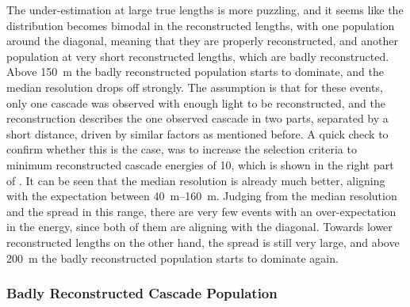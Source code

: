 The under-estimation at large true lengths is more puzzling, and it seems like the distribution becomes bimodal in the reconstructed lengths, with one population around the diagonal, meaning that they are properly reconstructed, and another population at very short reconstructed lengths, which are badly reconstructed. Above \SI{150}{\meter} the badly reconstructed population starts to dominate, and the median resolution drops off strongly. The assumption is that for these events, only one cascade was observed with enough light to be reconstructed, and the reconstruction describes the one observed cascade in two parts, separated by a short distance, driven by similar factors as mentioned before. A quick check to confirm whether this is the case, was to increase the selection criteria to minimum reconstructed cascade energies of \SI{10}{\gev}, which is shown in the right part of . It can be seen that the median resolution is already much better, aligning with the expectation between \SIrange[range-phrase=~and~]{40}{160}{\meter}. Judging from the median resolution and the spread in this range, there are very few events with an over-expectation in the energy, since both of them are aligning with the diagonal. Towards lower reconstructed lengths on the other hand, the spread is still very large, and above \SI{200}{\meter} the badly reconstructed population starts to dominate again.


\subsubsection{Badly Reconstructed Cascade Population}

